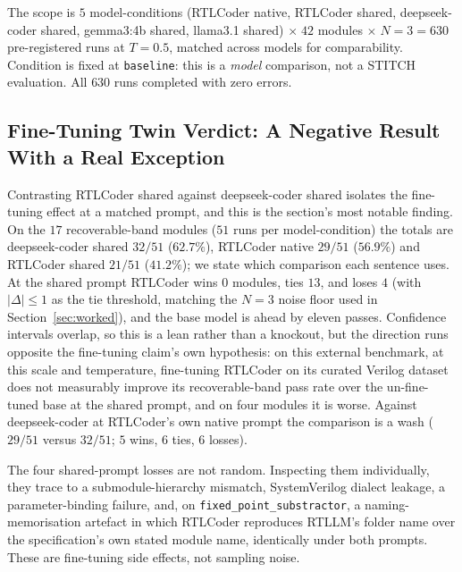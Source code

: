 \documentclass[11pt]{article}
\begin{document}
The scope is $5$ model-conditions (RTLCoder native, RTLCoder shared,
deepseek-coder shared, gemma3:4b shared, llama3.1 shared) $\times\;42$ modules
$\times\;N{=}3 = 630$ pre-registered runs at $T{=}0.5$, matched across models
for comparability. Condition is fixed at \texttt{baseline}: this is a
\emph{model} comparison, not a STITCH evaluation. All $630$ runs completed
with zero errors.

\subsection{Fine-Tuning Twin Verdict: A Negative Result With a Real Exception}
\label{sec:twin-finetune}

Contrasting RTLCoder shared against deepseek-coder shared isolates the
fine-tuning effect at a matched prompt, and this is the section's most
notable finding. On the $17$ recoverable-band modules ($51$ runs per
model-condition) the totals are deepseek-coder shared $32/51$ ($62.7\%$),
RTLCoder native $29/51$ ($56.9\%$) and RTLCoder shared $21/51$ ($41.2\%$); we
state which comparison each sentence uses. At the shared prompt RTLCoder wins
$0$ modules, ties $13$, and loses $4$ (with $|\Delta|\leq 1$ as the tie
threshold, matching the $N{=}3$ noise floor used in
Section~\ref{sec:worked}), and the base model is ahead by eleven passes.
Confidence intervals overlap, so this is a lean rather than a knockout, but
the direction runs opposite the fine-tuning claim's own hypothesis: on this
external benchmark, at this scale and temperature, fine-tuning RTLCoder on its
curated Verilog dataset does not measurably improve its recoverable-band pass
rate over the un-fine-tuned base at the shared prompt, and on four modules it
is worse. Against deepseek-coder at RTLCoder's own native prompt the
comparison is a wash ($29/51$ versus $32/51$; $5$ wins, $6$ ties, $6$
losses).

The four shared-prompt losses are not random. Inspecting them individually,
they trace to a submodule-hierarchy mismatch, SystemVerilog dialect leakage, a
parameter-binding failure, and, on \texttt{fixed\_point\_substractor}, a
naming-memorisation artefact in which RTLCoder reproduces RTLLM's folder name
over the specification's own stated module name, identically under both
prompts. These are fine-tuning side effects, not sampling noise.
\end{document}
